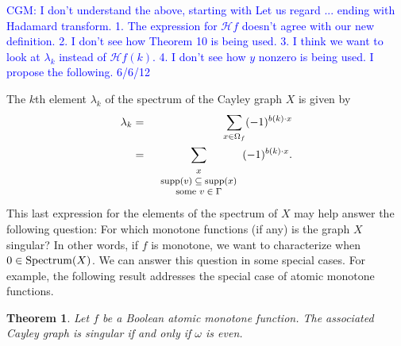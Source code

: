 \documentclass[12pt]{article}
\def\blue#1{\textcolor{blue}{#1}}
\newcommand{\cgm}[1]{\blue{CGM: #1}}
\newtheorem{theorem}{Theorem}
\begin{document}
\cgm{I don't understand the above, starting with Let us regard ... ending with Hadamard transform.
1.  The expression for $\mathcal H f$ doesn't agree with our new definition.  2.  I don't see how Theorem 10 
is being used.  3.  I think we want to look at $\lambda_k$ instead of $\mathcal H f (k)$.  4.  I don't see how $y$ 
nonzero is being used.  I propose the following.  6/6/12}

The $k$th element $\lambda_k$ of the spectrum of the Cayley graph $X$ is given by
\begin{eqnarray*}
\lambda_k 
 & =&  \sum_{x\in \Omega_f}  (-1)^{b(k)\cdot x}\\
 & =&  \sum_{{\footnotesize{
\begin{array}{c}
x \\
{\rm supp}(v) \subseteq {\rm supp}(x) \\
{\rm some}\ v\in  \Gamma
\end{array}
}}}
(-1)^{b(k) \cdot x}
.\\
\end{eqnarray*}
This last expression for the elements of the spectrum of $X$ may help answer
the following question: For which monotone functions (if any) is the graph
$X$ singular? 
In other words, if $f$ is monotone,
we want to characterize when $0\in {\rm Spectrum}(X)$.
We can answer this question in some special cases.
For example, the following result addresses the special case of atomic
monotone functions.

\begin{theorem}
Let $f$ be a Boolean atomic monotone function.
The associated Cayley graph is singular if and only if
$\omega$ is even.

\end{theorem}
\end{document}
